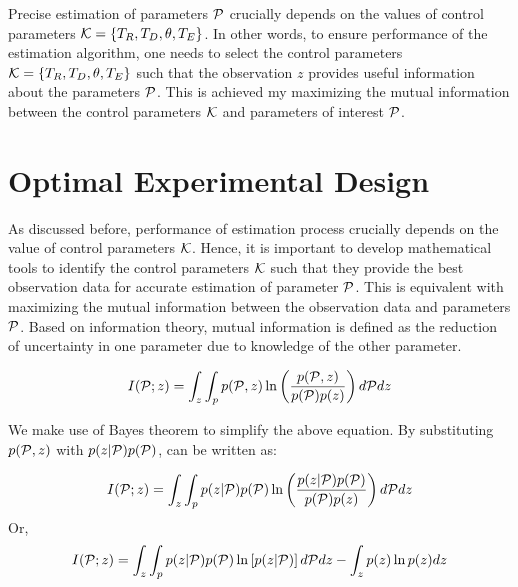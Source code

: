 \documentclass{article}         %
\theoremstyle{definition}
\theoremstyle{remark}
\begin{document}
Precise estimation of parameters $\mathcal{P}$ crucially depends on the values of control parameters $\mathcal{K}=\{T_R,T_D,\theta,T_E\}$.  In other words, to ensure performance of the estimation algorithm, one needs to select the control parameters $\mathcal{K}=\{T_R,T_D,\theta,T_E\}$ such that the observation $z$ provides useful information about the parameters $\mathcal{P}$. This is achieved my maximizing the mutual information between the control parameters $\mathcal{K}$ and parameters of interest $\mathcal{P}$. 



\section*{Optimal Experimental Design}\label{oed}
As discussed before, performance of estimation process crucially depends on the value of control parameters $\mathcal{K}$. Hence, it is important to develop mathematical tools to identify the control parameters $\mathcal{K}$ such that they provide the best observation data for accurate estimation of parameter $\mathcal{P}$. This is equivalent with maximizing the mutual information between the observation data and parameters $\mathcal{P}$. Based on information theory, mutual information is defined as the reduction of uncertainty in one parameter due to knowledge of the other parameter.

\begin{equation} \label{mi}
I(\mathcal{P};z)=\int_z\int_p p(\mathcal{P},z)\ln\left(\frac{p(\mathcal{P},z)}{p(\mathcal{P})p(z)}\right)d\mathcal{P} dz
\end{equation}

We make use of Bayes theorem to simplify the above equation. By substituting $p(\mathcal{P},z)$ with $p(z|\mathcal{P})p(\mathcal{P})$,  can be written as:

\begin{equation} \label{mi2}
I(\mathcal{P};z)=\int_z\int_p p(z|\mathcal{P})p(\mathcal{P})\ln\left(\frac{p(z|\mathcal{P})p(\mathcal{P})}{p(\mathcal{P})p(z)}\right)d\mathcal{P} dz
\end{equation}
Or,
\begin{equation} \label{mi3}
I(\mathcal{P};z)=\int_z\int_p p(z|\mathcal{P})p(\mathcal{P})\ln\left[p(z|\mathcal{P})\right]d\mathcal{P} dz - \int_z p(z) \ln p(z)dz
\end{equation}
\end{document}
